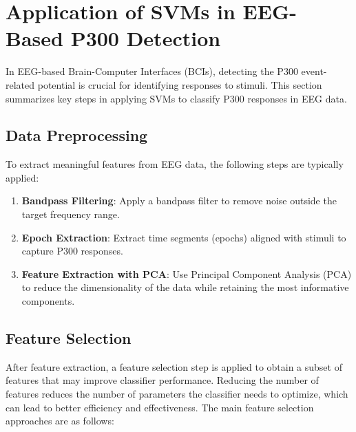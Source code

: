 \documentclass{article}
\begin{document}
\section{Application of SVMs in EEG-Based P300 Detection}
In EEG-based Brain-Computer Interfaces (BCIs), detecting the P300 event-related potential is crucial for identifying responses to stimuli. This section summarizes key steps in applying SVMs to classify P300 responses in EEG data.

\subsection{Data Preprocessing}
To extract meaningful features from EEG data, the following steps are typically applied:
\begin{enumerate}
    \item \textbf{Bandpass Filtering}: Apply a bandpass filter to remove noise outside the target frequency range.
    \item \textbf{Epoch Extraction}: Extract time segments (epochs) aligned with stimuli to capture P300 responses.
    \item \textbf{Feature Extraction with PCA}: Use Principal Component Analysis (PCA) to reduce the dimensionality of the data while retaining the most informative components.
\end{enumerate}

\subsection{Feature Selection}
After feature extraction, a feature selection step is applied to obtain a subset of features that may improve classifier performance. Reducing the number of features reduces the number of parameters the classifier needs to optimize, which can lead to better efficiency and effectiveness. The main feature selection approaches are as follows:
\end{document}
